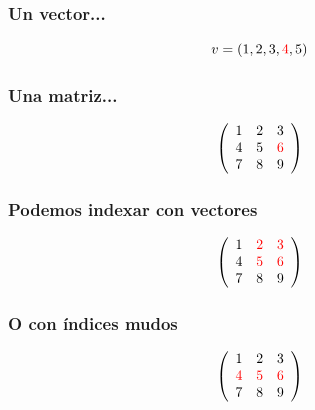 \documentclass[12pt]{beamer}
\begin{document}

\begin{frame}
\frametitle{Un vector...}
\[v = (1,2,3,\textcolor{red}{4},5) \]
\testcode
\end{frame}


\begin{frame}
\frametitle{Una matriz...}
\[ \left(
\begin{array}{ccc}
1&2&3\\
4&5&\textcolor{red}{6}\\
7&8&9
\end{array} \right)
\]
\testcode
\end{frame}



\begin{frame}
\frametitle{Podemos indexar con vectores}
\[ \left(
\begin{array}{ccc}
1&\textcolor{red}{2}&\textcolor{red}{3}\\
4&\textcolor{red}{5}&\textcolor{red}{6}\\
7&8&9
\end{array} \right)
\]
\testcode
\end{frame}


\begin{frame}
\frametitle{O con índices mudos}
\[ \left(
\begin{array}{ccc}
1&2&3\\
\textcolor{red}{4}&\textcolor{red}{5}&\textcolor{red}{6}\\
7&8&9
\end{array} \right)
\]
\testcode
\end{frame}
\end{document}
